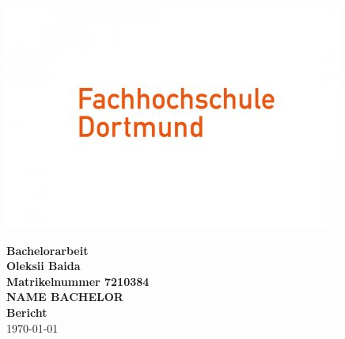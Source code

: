 \begin{titlepage}
  \includegraphics[width = 0.25\pdfpagewidth]{./Bilder/FHDO.jpg}
  \begin{center}
    
    \huge \textbf{\textsf{Bachelorarbeit}} \\
    \vspace{3cm}
    \large \textbf{Oleksii Baida}\\
    \textbf{Matrikelnummer 7210384}\\
    \vspace{3cm}
    \large \textbf{NAME BACHELOR}\\
    \vspace{1cm}
    \large \textbf{Bericht}\\
    \vspace{1cm}
    \today
  \end{center}
\end{titlepage}